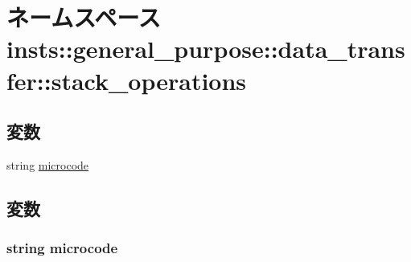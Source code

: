 \hypertarget{namespaceinsts_1_1general__purpose_1_1data__transfer_1_1stack__operations}{
\section{ネームスペース insts::general\_\-purpose::data\_\-transfer::stack\_\-operations}
\label{namespaceinsts_1_1general__purpose_1_1data__transfer_1_1stack__operations}
}
\subsection*{変数}
\begin{DoxyCompactItemize}
\item 
string \hyperlink{namespaceinsts_1_1general__purpose_1_1data__transfer_1_1stack__operations_a770f11a173e99389a8802f0107ed8f52}{microcode}
\end{DoxyCompactItemize}


\subsection{変数}
\hypertarget{namespaceinsts_1_1general__purpose_1_1data__transfer_1_1stack__operations_a770f11a173e99389a8802f0107ed8f52}{
\subsubsection[{microcode}]{\setlength{\rightskip}{0pt plus 5cm}string {\bf microcode}}}
\label{namespaceinsts_1_1general__purpose_1_1data__transfer_1_1stack__operations_a770f11a173e99389a8802f0107ed8f52}
